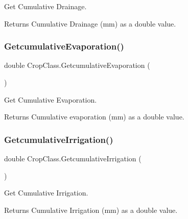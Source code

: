 Get Cumulative Drainage. 

\begin{DoxyReturn}{Returns}
Cumulative Drainage (mm) as a double value. 
\end{DoxyReturn}
\mbox{\label{class_crop_class_a07f500e6b248c2c073140b44e4e4d8c7}} 
\subsubsection{\texorpdfstring{GetcumulativeEvaporation()}{GetcumulativeEvaporation()}}
{\footnotesize\ttfamily double Crop\+Class.\+Getcumulative\+Evaporation (\begin{DoxyParamCaption}{ }\end{DoxyParamCaption})\hspace{0.3cm}{\ttfamily [inline]}}



Get Cumulative Evaporation. 

\begin{DoxyReturn}{Returns}
Cumulative evaporation (mm) as a double value. 
\end{DoxyReturn}
\mbox{\label{class_crop_class_a744025c0a7e2f951975d59a4fa49a5e7}} 
\subsubsection{\texorpdfstring{GetcumulativeIrrigation()}{GetcumulativeIrrigation()}}
{\footnotesize\ttfamily double Crop\+Class.\+Getcumulative\+Irrigation (\begin{DoxyParamCaption}{ }\end{DoxyParamCaption})\hspace{0.3cm}{\ttfamily [inline]}}



Get Cumulative Irrigation. 

\begin{DoxyReturn}{Returns}
Cumulative Irrigation (mm) as a double value. 
\end{DoxyReturn}
\mbox{\label{class_crop_class_a949f4be661243a2809af653cead177e1}} 
